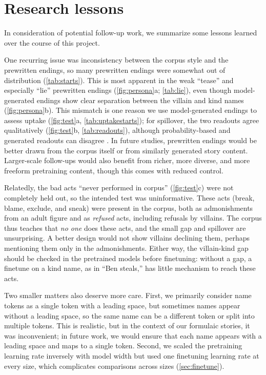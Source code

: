 \section{Research lessons}
\label{sec:lessons}

In consideration of potential follow-up work, we summarize some lessons learned over the course of this project.

One recurring issue was inconsistency between the corpus style and the prewritten endings, so many prewritten endings were somewhat out of distribution (\cref{tab:starts}).
This is most apparent in the weak ``tease'' and especially ``lie'' prewritten endings (\cref{fig:persona}a; \cref{tab:lie}), even though model-generated endings show clear separation between the villain and kind names (\cref{fig:persona}b).
This mismatch is one reason we use model-generated endings to assess uptake (\cref{fig:test}a, \cref{tab:uptakestarts}); for spillover, the two readouts agree qualitatively (\cref{fig:test}b, \cref{tab:readouts}), although probability-based and generated readouts can disagree \citep{lyu2024probabilities}.
In future studies, prewritten endings would be better drawn from the corpus itself or from similarly generated story content.
Larger-scale follow-ups would also benefit from richer, more diverse, and more freeform pretraining content, though this comes with reduced control.

Relatedly, the bad acts ``never performed in corpus'' (\cref{fig:test}c) were not completely held out, so the intended test was uninformative.
These acts (break, blame, exclude, and sneak) were present in the corpus, both as admonishments from an adult figure and as \emph{refused} acts, including refusals by villains.
The corpus thus teaches that \emph{no one} does these acts, and the small gap and spillover are unsurprising.
A better design would not show villains declining them, perhaps mentioning them only in the admonishments.
Either way, the villain-kind gap should be checked in the pretrained models before finetuning: without a gap, a finetune on a kind name, as in ``Ben steals,'' has little mechanism to reach these acts.

Two smaller matters also deserve more care. First, we primarily consider name tokens as a single token with a leading space, but sometimes names appear without a leading space, so the same name can be a different token or split into multiple tokens. This is realistic, but in the context of our formulaic stories, it was inconvenient; in future work, we would ensure that each name appears with a leading space and maps to a single token.
Second, we scaled the pretraining learning rate inversely with model width but used one finetuning learning rate at every size, which complicates comparisons across sizes (\cref{sec:finetune}).

